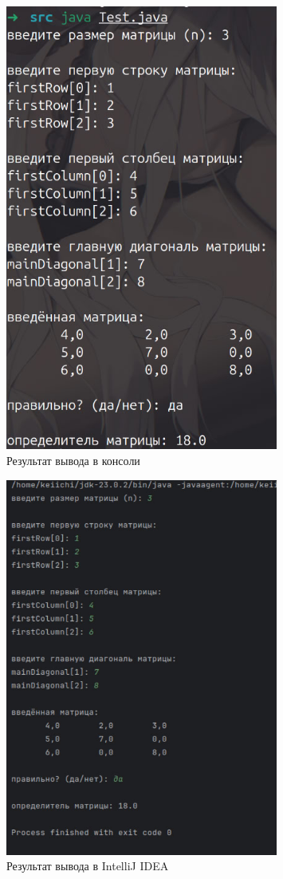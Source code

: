 \documentclass[a4paper, 14pt]{extarticle}
\begin{document}
\begin{figure}[!htb]
	\centering
	\includegraphics[width=0.8\textwidth]{img2}
\caption{Результат вывода в консоли}
\label{fig:img1}
\end{figure}

\begin{figure}[!htb]
	\centering
	\includegraphics[width=0.8\textwidth]{img1}
\caption{Результат вывода в  IntelliJ IDEA}
\label{fig:img2}
\end{figure}
\end{document}
